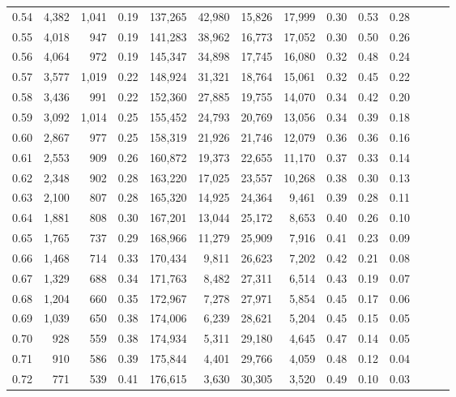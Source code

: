 \begin{tabular}{rrrrrrrrrrrrrr}
0.54 &  4,382 &  1,041 &  0.19 &  137,265 &   42,980 &  15,826 &  17,999 &  0.30 &  0.53 &      0.28 \\
0.55 &  4,018 &    947 &  0.19 &  141,283 &   38,962 &  16,773 &  17,052 &  0.30 &  0.50 &      0.26 \\
0.56 &  4,064 &    972 &  0.19 &  145,347 &   34,898 &  17,745 &  16,080 &  0.32 &  0.48 &      0.24 \\
0.57 &  3,577 &  1,019 &  0.22 &  148,924 &   31,321 &  18,764 &  15,061 &  0.32 &  0.45 &      0.22 \\
0.58 &  3,436 &    991 &  0.22 &  152,360 &   27,885 &  19,755 &  14,070 &  0.34 &  0.42 &      0.20 \\
0.59 &  3,092 &  1,014 &  0.25 &  155,452 &   24,793 &  20,769 &  13,056 &  0.34 &  0.39 &      0.18 \\
0.60 &  2,867 &    977 &  0.25 &  158,319 &   21,926 &  21,746 &  12,079 &  0.36 &  0.36 &      0.16 \\
0.61 &  2,553 &    909 &  0.26 &  160,872 &   19,373 &  22,655 &  11,170 &  0.37 &  0.33 &      0.14 \\
0.62 &  2,348 &    902 &  0.28 &  163,220 &   17,025 &  23,557 &  10,268 &  0.38 &  0.30 &      0.13 \\
0.63 &  2,100 &    807 &  0.28 &  165,320 &   14,925 &  24,364 &   9,461 &  0.39 &  0.28 &      0.11 \\
0.64 &  1,881 &    808 &  0.30 &  167,201 &   13,044 &  25,172 &   8,653 &  0.40 &  0.26 &      0.10 \\
0.65 &  1,765 &    737 &  0.29 &  168,966 &   11,279 &  25,909 &   7,916 &  0.41 &  0.23 &      0.09 \\
0.66 &  1,468 &    714 &  0.33 &  170,434 &    9,811 &  26,623 &   7,202 &  0.42 &  0.21 &      0.08 \\
0.67 &  1,329 &    688 &  0.34 &  171,763 &    8,482 &  27,311 &   6,514 &  0.43 &  0.19 &      0.07 \\
0.68 &  1,204 &    660 &  0.35 &  172,967 &    7,278 &  27,971 &   5,854 &  0.45 &  0.17 &      0.06 \\
0.69 &  1,039 &    650 &  0.38 &  174,006 &    6,239 &  28,621 &   5,204 &  0.45 &  0.15 &      0.05 \\
0.70 &    928 &    559 &  0.38 &  174,934 &    5,311 &  29,180 &   4,645 &  0.47 &  0.14 &      0.05 \\
0.71 &    910 &    586 &  0.39 &  175,844 &    4,401 &  29,766 &   4,059 &  0.48 &  0.12 &      0.04 \\
0.72 &    771 &    539 &  0.41 &  176,615 &    3,630 &  30,305 &   3,520 &  0.49 &  0.10 &      0.03 \\

\end{tabular}

